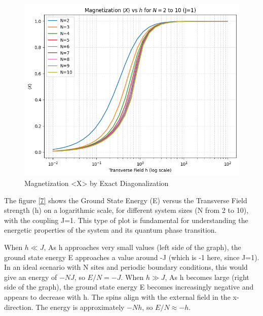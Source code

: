 \documentclass[a4paper]{article}
\begin{document}
\begin{figure}[htbp]
    \centering
    \includegraphics[width=0.5\linewidth]{images/classical_solution.png}
    \caption{Magnetization <X> by Exact Diagonalization}
    \label{6}
\end{figure}

The figure \ref{7} shows the Ground State Energy (E) versus the Transverse Field strength (h) on a logarithmic scale, for different system sizes (N from 2 to 10), with the coupling J=1. This type of plot is fundamental for understanding the energetic properties of the system and its quantum phase transition.

When $h\ll J$, As h approaches very small values (left side of the graph), the ground state energy E approaches a value around -J (which is -1 here, since J=1). In an ideal scenario with N sites and periodic boundary conditions, this would give an energy of $-NJ$, so $E/N=-J$. When $h \gg J$, As h becomes large (right side of the graph), the ground state energy E becomes increasingly negative and appears to decrease with h. The spins align with the external field in the x-direction. The energy is approximately $-Nh$, so $E/N \approx-h$.
\end{document}
